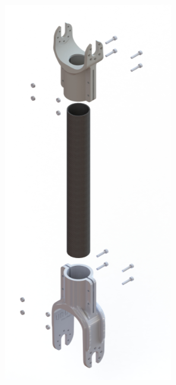 \begin{figure}[!ht]
    \centering
    \begin{subfigure}[b]{0.3\linewidth}
      \includegraphics[width=\linewidth]{chapter4/images/carb_shin.PNG}

\end{subfigure}
\end{figure}
